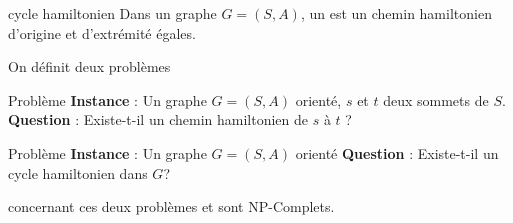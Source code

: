 \begin{definition}{}{cycle hamiltonien}
    Dans un graphe $G = (S,A)$, un  est un chemin hamiltonien d'origine et d'extrémité égales.
\end{definition}

On définit deux problèmes

\begin{definition}{}{Problème \cheminham}
    \textbf{Instance} : Un graphe $G=(S,A)$ orienté, $s$ et $t$ deux sommets de $S$.
    \textbf{Question} : Existe-t-il un chemin hamiltonien de $s$ à $t$ ?
\end{definition}

\begin{definition}{}{Problème \cycleham}
    \textbf{Instance} : Un graphe $G=(S,A)$ orienté
    \textbf{Question} : Existe-t-il un cycle hamiltonien dans $G$?
\end{definition}

\begin{proposition}{}{concernant ces deux problèmes}
    \cheminham et \cycleham sont NP-Complets.
\end{proposition}

